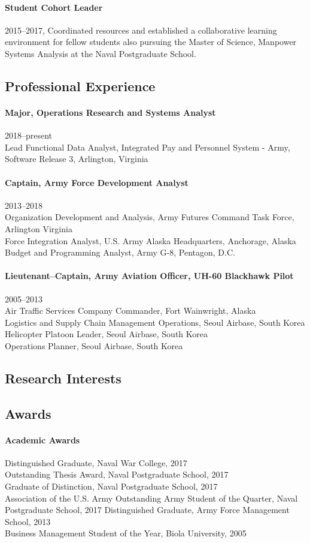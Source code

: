 \documentclass[12pt,letterpaper]{article}
\begin{document}
\paragraph{Student Cohort Leader}2015--2017, Coordinated resources and established a collaborative learning environment for fellow students also pursuing the Master of Science, Manpower Systems Analysis at the Naval Postgraduate School.
\subsection{Professional Experience} 
\paragraph{Major, Operations Research and Systems Analyst} 2018--present\\
Lead Functional Data Analyst, Integrated Pay and Personnel System - Army, Software Release 3, Arlington, Virginia
\paragraph{Captain, Army Force Development Analyst} 2013--2018\\
Organization Development and Analysis, Army Futures Command Task Force, Arlington Virginia\\
Force Integration Analyst, U.S. Army Alaska Headquarters, Anchorage, Alaska\\
Budget and Programming Analyst, Army G-8, Pentagon, D.C.
\paragraph{Lieutenant--Captain, Army Aviation Officer, UH-60 Blackhawk Pilot} 2005--2013\\
Air Traffic Services Company Commander, Fort Wainwright, Alaska\\
Logistics and Supply Chain Management Operations, Seoul Airbase, South Korea\\
Helicopter Platoon Leader, Seoul Airbase, South Korea\\
Operations Planner, Seoul Airbase, South Korea
\subsection{Research Interests}
\subsection{Awards}
\paragraph{Academic Awards}
Distinguished Graduate, Naval War College, 2017\\
Outstanding Thesis Award, Naval Postgraduate School, 2017\\
Graduate of Distinction, Naval Postgraduate School, 2017\\
Association of the U.S. Army Outstanding Army Student of the Quarter, Naval Postgraduate School, 2017
Distinguished Graduate, Army Force Management School, 2013\\
Business Management Student of the Year, Biola University, 2005
\end{document}
